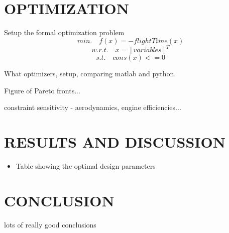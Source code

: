 \documentclass[letterpaper, 10 pt, conference]{ieeeconf}  %
\newcommand{\of}[1]{\ensuremath{\left(#1\right)}}
\begin{document}
\section{OPTIMIZATION}
Setup the formal optimization problem
\begin{equation}
min. \quad f\of{x} = -flightTime\of{x}
\label{eq:objective}
\end{equation}
\begin{equation}
w.r.t. \quad x = [variables]^T
\label{eq:vars}
\end{equation}
\begin{equation}
s.t. \quad cons\of{x} <= 0 
\label{eq:constrants}
\end{equation}

What optimizers, setup, comparing matlab and python. 

Figure of Pareto fronts...

constraint sensitivity - aerodynamics, engine efficiencies...

\section{RESULTS AND DISCUSSION}

\begin{itemize}
	\item{Table showing the optimal design parameters}
\end{itemize}



\section{CONCLUSION}

lots of really good conclusions









\end{document}
